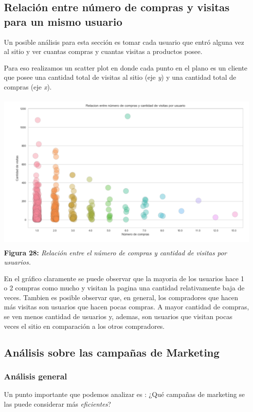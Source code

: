 \documentclass[titlepage,a4paper]{article}
\begin{document}
	\subsection{Relación entre número de compras y visitas para un mismo usuario}
  Un posible análisis para esta sección es tomar cada usuario que entró alguna vez al sitio y ver cuantas compras y cuantas visitas a productos posee.
  
  Para eso realizamos un scatter plot en donde cada punto en el plano es un cliente que posee una cantidad total de visitas al sitio (eje \textit{y}) y una cantidad total de compras (eje  \textit{x}).
  
	\begin{center}
	\includegraphics[width=15cm,height = 8cm] {relacionEntreComprasYCantidadDeVisitas.jpg}\\
	\textbf{Figura 28:}  \textit{ Relación entre el número de compras y cantidad de visitas por usuarios.}
	\end{center}
	
	En el gráfico claramente se puede observar que la mayoria de los usuarios hace 1 o 2 compras como mucho y visitan la pagina una cantidad relativamente baja de veces. Tambien es posible observar que, en general, los compradores que hacen más visitas son usuarios que hacen pocas compras. A mayor cantidad de compras, se ven menos cantidad de usuarios y, ademas, son usuarios que visitan pocas veces el sitio en comparación a los otros compradores.
	
	 \subsection{Análisis sobre las campañas de Marketing}
	\subsubsection{Análisis general}
	Un punto importante que podemos analizar es : ¿Qué campañas de marketing se las puede considerar más  \textit{eficientes}?
	
\end{document}
